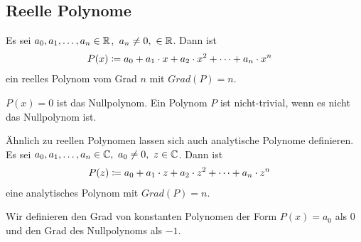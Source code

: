 \subsection{Reelle Polynome}
\thispagestyle{pagenumberonly}

\begin{definition}
    Es sei $a_0,a_1, \dots, a_n\in\mathbb{R}$,~$a_n \neq 0,~\in\mathbb{R}$. Dann ist
    \begin{align*}
        P(x) &\coloneqq a_0 + a_1 \cdot x + a_2 \cdot x^2 + \dots + a_n \cdot x^n
    \end{align*}
    ein reelles Polynom vom Grad $n$ mit $Grad(P) = n$.
\end{definition}

\begin{definition}[Nullpolynom]
    $P(x) = 0$ ist das Nullpolynom. Ein Polynom $P$ ist nicht-trivial, wenn es nicht das Nullpolynom ist.
\end{definition}

\begin{bemerkung}
    Ähnlich zu reellen Polynomen lassen sich auch analytische Polynome definieren. Es sei $a_0, a_1, \dots, a_n \in\mathbb{C},~a_0\neq 0,~z\in\mathbb{C}$. Dann ist
    \begin{align*}
        P(z) &\coloneqq a_0 + a_1\cdot z + a_2\cdot z^2 + \dots + a_n\cdot z^n
    \end{align*}
    eine analytisches Polynom mit $Grad(P) = n$.
\end{bemerkung}

\begin{definition}
    Wir definieren den Grad von konstanten Polynomen der Form $P(x) = a_0$ als 0 und den Grad des Nullpolynoms als $-1$.
\end{definition}

